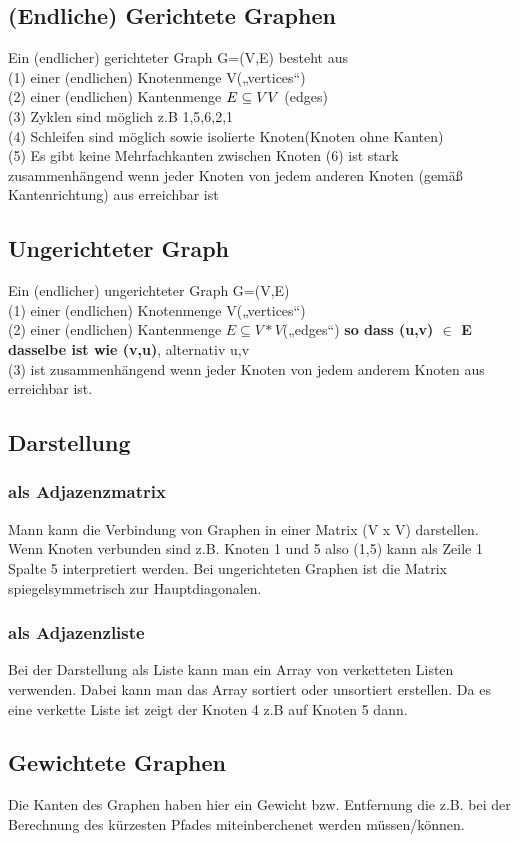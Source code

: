 \documentclass[jou,apacite]{apa6}
\begin{document}
\subsection{(Endliche) Gerichtete Graphen}
Ein (endlicher) gerichteter Graph G=(V,E) besteht aus \\
(1) einer (endlichen) Knotenmenge V(„vertices“) \\
(2) einer (endlichen) Kantenmenge $E \subseteq V\*V$ (edges) \\
(3) Zyklen sind möglich z.B 1,5,6,2,1 \\
(4) Schleifen sind möglich sowie isolierte Knoten(Knoten ohne Kanten) \\
(5) Es gibt keine Mehrfachkanten zwischen Knoten
(6) ist stark zusammenhängend wenn jeder Knoten von jedem anderen Knoten (gemäß Kantenrichtung) aus erreichbar ist
\subsection{Ungerichteter Graph}
Ein (endlicher) ungerichteter Graph G=(V,E) \\
(1) einer (endlichen) Knotenmenge V(„vertices“) \\
(2) einer (endlichen) Kantenmenge $E \subseteq V*V$(„edges“) {\bfseries so dass (u,v) $\in$ E dasselbe ist wie (v,u)},
alternativ {u,v}\\
(3) ist zusammenhängend wenn jeder Knoten von jedem anderem Knoten aus erreichbar ist.
\subsection{Darstellung}
\subsubsection{als Adjazenzmatrix}
Mann kann die Verbindung von Graphen in einer Matrix (V x V) darstellen. Wenn Knoten verbunden sind z.B. Knoten 1 und 5 also (1,5) kann als Zeile 1 Spalte 5 interpretiert werden. Bei ungerichteten Graphen ist die Matrix spiegelsymmetrisch zur Hauptdiagonalen.
\subsubsection{als Adjazenzliste}
Bei der Darstellung als Liste kann man ein Array von verketteten Listen verwenden. Dabei kann man das Array sortiert oder unsortiert erstellen. Da es eine verkette Liste ist zeigt der Knoten 4 z.B auf Knoten 5 dann. 
\subsection{Gewichtete Graphen}
Die Kanten des Graphen haben hier ein Gewicht bzw. Entfernung die z.B. bei der Berechnung des kürzesten Pfades miteinberchenet werden müssen/können.
\end{document}

